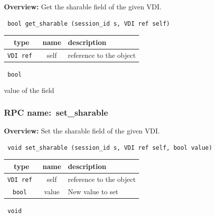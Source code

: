 {\bf Overview:} 
Get the sharable field of the given VDI.

\begin{verbatim} bool get_sharable (session_id s, VDI ref self)\end{verbatim}



 
\vspace{0.3cm}
\begin{tabular}{|c|c|p{7cm}|}
 \hline
{\bf type} & {\bf name} & {\bf description} \\ \hline
{\tt VDI ref } & self & reference to the object \\ \hline 

\end{tabular}

\vspace{0.3cm}

{\tt 
bool
}


value of the field
\vspace{0.3cm}
\vspace{0.3cm}
\vspace{0.3cm}
\subsubsection{RPC name:~set\_sharable}

{\bf Overview:} 
Set the sharable field of the given VDI.

\begin{verbatim} void set_sharable (session_id s, VDI ref self, bool value)\end{verbatim}



 
\vspace{0.3cm}
\begin{tabular}{|c|c|p{7cm}|}
 \hline
{\bf type} & {\bf name} & {\bf description} \\ \hline
{\tt VDI ref } & self & reference to the object \\ \hline 

{\tt bool } & value & New value to set \\ \hline 

\end{tabular}

\vspace{0.3cm}

{\tt 
void
}



